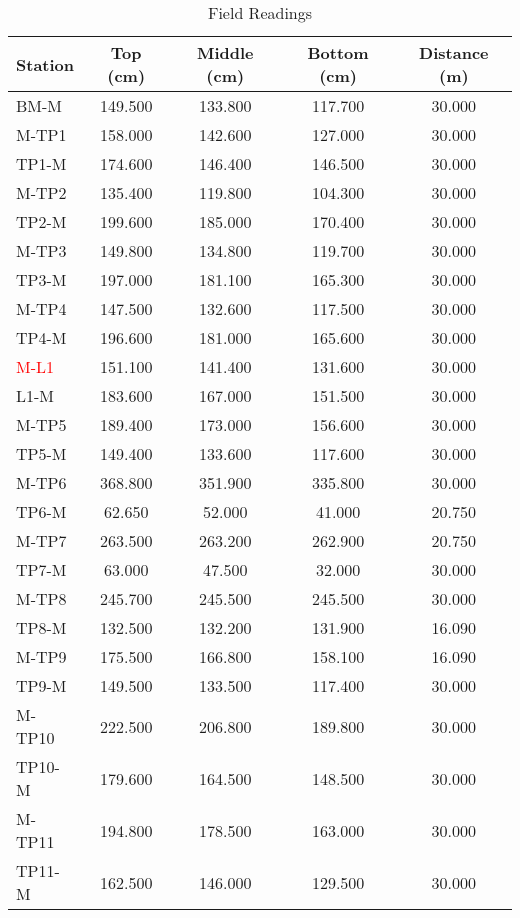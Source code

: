 \documentclass[12pt]{report}
\begin{document}
\begin{longtable}{lcccc}
\caption{Field Readings} \label{tab:mylongtable} \\ %

\toprule
Station & Top (cm) & Middle (cm) & Bottom (cm) & Distance (m) \\
\midrule
\endhead
\bottomrule
\endfoot

BM-M & 149.500 & 133.800 & 117.700 & 30.000 \\
M-TP1 & 158.000 & 142.600 & 127.000 & 30.000 \\
TP1-M & 174.600 & 146.400 & 146.500 & 30.000 \\
M-TP2 & 135.400 & 119.800 & 104.300 & 30.000 \\
TP2-M & 199.600 & 185.000 & 170.400 & 30.000 \\
M-TP3 & 149.800 & 134.800 & 119.700 & 30.000 \\
TP3-M & 197.000 & 181.100 & 165.300 & 30.000 \\
M-TP4 & 147.500 & 132.600 & 117.500 & 30.000 \\
TP4-M & 196.600 & 181.000 & 165.600 & 30.000 \\
\textcolor{red}{M-L1} & 151.100 & 141.400 & 131.600 & 30.000 \\
L1-M & 183.600 & 167.000 & 151.500 & 30.000 \\
M-TP5 & 189.400 & 173.000 & 156.600 & 30.000 \\
TP5-M & 149.400 & 133.600 & 117.600 & 30.000 \\
M-TP6 & 368.800 & 351.900 & 335.800 & 30.000 \\
TP6-M & 62.650 & 52.000 & 41.000 & 20.750 \\
M-TP7 & 263.500 & 263.200 & 262.900 & 20.750 \\
TP7-M & 63.000 & 47.500 & 32.000 & 30.000 \\
M-TP8 & 245.700 & 245.500 & 245.500 & 30.000 \\
TP8-M & 132.500 & 132.200 & 131.900 & 16.090 \\
M-TP9 & 175.500 & 166.800 & 158.100 & 16.090 \\
TP9-M & 149.500 & 133.500 & 117.400 & 30.000 \\
M-TP10 & 222.500 & 206.800 & 189.800 & 30.000 \\
TP10-M & 179.600 & 164.500 & 148.500 & 30.000 \\
M-TP11 & 194.800 & 178.500 & 163.000 & 30.000 \\
TP11-M & 162.500 & 146.000 & 129.500 & 30.000 \\

\end{longtable}
\end{document}
